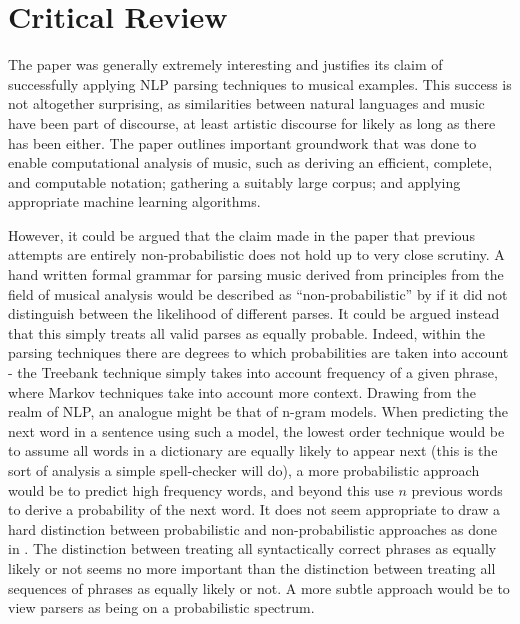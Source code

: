 \documentclass[a4paper,12pt]{article}
\begin{document}
\section{Critical Review}

The paper was generally extremely interesting and justifies its claim of successfully applying NLP parsing techniques to musical examples. This success is not altogether surprising, as similarities between natural languages and music have been part of discourse, at least artistic discourse for likely as long as there has been either. The paper outlines important groundwork that was done to enable computational analysis of music, such as deriving an efficient, complete, and computable notation; gathering a suitably large corpus; and applying appropriate machine learning algorithms.

However, it could be argued that the claim made in the paper that previous attempts are entirely non-probabilistic does not hold up to very close scrutiny. A hand written formal grammar for parsing music derived from principles from the field of musical analysis would be described as ``non-probabilistic'' by \cite{Bod_probabilisticgrammars} if it did not distinguish between the likelihood of different parses. It could be argued instead that this simply treats all valid parses as equally probable. Indeed, within the parsing techniques there are degrees to which probabilities are taken into account - the Treebank technique simply takes into account frequency of a given phrase, where Markov techniques take into account more context. Drawing from the realm of NLP, an analogue might be that of n-gram models. When predicting the next word in a sentence using such a model, the lowest order technique would be to assume all words in a dictionary are equally likely to appear next (this is the sort of analysis a simple spell-checker will do), a more probabilistic approach would be to predict high frequency words, and beyond this use $n$ previous words to derive a probability of the next word. It does not seem appropriate to draw a hard distinction between probabilistic and non-probabilistic approaches as done in \cite{Bod_probabilisticgrammars}. The distinction between treating all syntactically correct phrases as equally likely or not seems no more important than the distinction between treating all sequences of phrases as equally likely or not. A more subtle approach would be to view parsers as being on a probabilistic spectrum.
\end{document}

